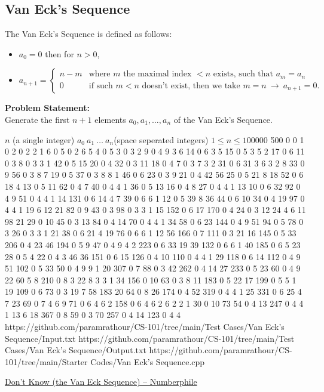 \subsection{Van Eck's Sequence}
The Van Eck's Sequence is defined as follows:
\begin{itemize}
	\item $a_0 = 0$ then for $n>0$,\\
	\item $a_{n+1} = \begin{cases}
		n-m & \text{where $m$ the maximal index $<n$ exists, such that $a_{m}=a_{n}$}\\
		0 & \text{if such $m<n$ doesn't exist, then we take $m=n\ \rightarrow\ a_{n+1}=0$.}
	\end{cases}$
\end{itemize}
\textbf{Problem Statement:}\\
Generate the first $n+1$ elements $a_0,a_1,\ldots,a_n$ of the Van Eck's Sequence.
\begin{testcasesMore}
	{$n$ \hfill(a single integer)}
	{$a_0\ a_1\ \ldots\ a_n$\hfill(space seperated integers)}
	{$1 \leq n \leq 100000$}
	{500}
	{0 0 1 0 2 0 2 2 1 6 0 5 0 2 6 5 4 0 5 3 0 3 2 9 0 4 9 3 6 14 0 6 3 5 15 0 5 3 5 2 17 0 6 11 0 3 8 0 3 3 1 42 0 5 15 20 0 4 32 0 3 11 18 0 4 7 0 3 7 3 2 31 0 6 31 3 6 3 2 8 33 0 9 56 0 3 8 7 19 0 5 37 0 3 8 8 1 46 0 6 23 0 3 9 21 0 4 42 56 25 0 5 21 8 18 52 0 6 18 4 13 0 5 11 62 0 4 7 40 0 4 4 1 36 0 5 13 16 0 4 8 27 0 4 4 1 13 10 0 6 32 92 0 4 9 51 0 4 4 1 14 131 0 6 14 4 7 39 0 6 6 1 12 0 5 39 8 36 44 0 6 10 34 0 4 19 97 0 4 4 1 19 6 12 21 82 0 9 43 0 3 98 0 3 3 1 15 152 0 6 17 170 0 4 24 0 3 12 24 4 6 11 98 21 29 0 10 45 0 3 13 84 0 4 14 70 0 4 4 1 34 58 0 6 23 144 0 4 9 51 94 0 5 78 0 3 26 0 3 3 1 21 38 0 6 21 4 19 76 0 6 6 1 12 56 166 0 7 111 0 3 21 16 145 0 5 33 206 0 4 23 46 194 0 5 9 47 0 4 9 4 2 223 0 6 33 19 39 132 0 6 6 1 40 185 0 6 5 23 28 0 5 4 22 0 4 3 46 36 151 0 6 15 126 0 4 10 110 0 4 4 1 29 118 0 6 14 112 0 4 9 51 102 0 5 33 50 0 4 9 9 1 20 307 0 7 88 0 3 42 262 0 4 14 27 233 0 5 23 60 0 4 9 22 60 5 8 210 0 8 3 22 8 3 3 1 34 156 0 10 63 0 3 8 11 183 0 5 22 17 199 0 5 5 1 19 109 0 6 73 0 3 19 7 58 183 20 64 0 8 26 174 0 4 52 319 0 4 4 1 25 331 0 6 25 4 7 23 69 0 7 4 6 9 71 0 6 4 6 2 158 0 6 4 6 2 6 2 2 1 30 0 10 73 54 0 4 13 247 0 4 4 1 13 6 18 367 0 8 59 0 3 70 257 0 4 14 123 0 4 4}
	{https://github.com/paramrathour/CS-101/tree/main/Test Cases/Van Eck's Sequence/Input.txt}
	{https://github.com/paramrathour/CS-101/tree/main/Test Cases/Van Eck's Sequence/Output.txt}
	{https://github.com/paramrathour/CS-101/tree/main/Starter Codes/Van Eck's Sequence.cpp}
\end{testcasesMore}
\begin{funvideo}
	\href{https://youtu.be/etMJxB-igrc}{Don't Know (the Van Eck Sequence) -- Numberphile}
\end{funvideo}